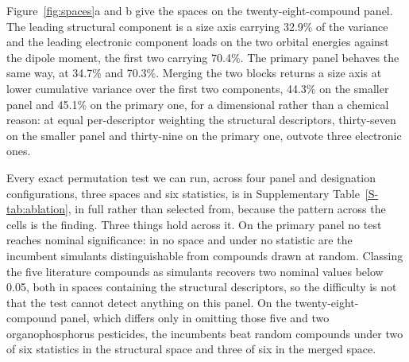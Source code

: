 \documentclass[1p,times]{elsarticle}
\begin{document}
Figure~\ref{fig:spaces}a and b give the spaces on the twenty-eight-compound
panel. The leading structural component is a
size axis carrying 32.9\% of the variance and the leading electronic component
loads on the two orbital energies against the dipole moment, the first two
carrying 70.4\%. The primary panel behaves the same way, at 34.7\% and 70.3\%.
Merging the two blocks returns a size axis at lower cumulative variance over the
first two components, 44.3\% on the smaller panel and 45.1\% on the primary one,
for a dimensional rather than a chemical reason: at equal
per-descriptor weighting the structural descriptors, thirty-seven on the smaller
panel and thirty-nine on the primary one, outvote three electronic ones.

Every exact permutation test we can run, across four panel and designation
configurations, three spaces and six statistics, is in Supplementary
Table~\ref{S-tab:ablation}, in full rather than selected from, because the
pattern across the cells is the finding. Three things hold across it. On the
primary panel no test reaches nominal significance: in no space and under no
statistic are the incumbent simulants distinguishable from compounds drawn at
random. Classing the five literature compounds as simulants recovers two
nominal values below 0.05, both in spaces containing the structural
descriptors, so the difficulty is not that the test cannot detect anything on
this panel. On the twenty-eight-compound panel, which differs only in omitting
those five and two organophosphorus pesticides, the incumbents beat random
compounds under two of six statistics in the structural space and three of six
in the merged space.
\end{document}
